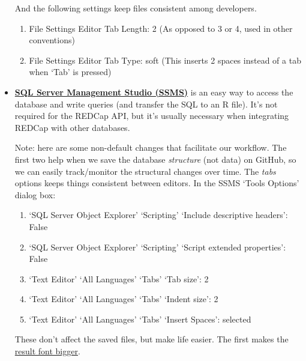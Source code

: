 \documentclass[]{book}
\providecommand{\tightlist}{%
  \setlength{\itemsep}{0pt}\setlength{\parskip}{0pt}}
\begin{document}
\begin{itemize}
  And the following settings keep files consistent among developers.

  \begin{enumerate}
  \def\labelenumi{\arabic{enumi}.}
  \tightlist
  \item
    File \textbar{} Settings \textbar{} Editor \textbar{} Tab Length: 2 (As opposed to 3 or 4, used in other conventions)
  \item
    File \textbar{} Settings \textbar{} Editor \textbar{} Tab Type: soft (This inserts 2 spaces instead of a tab when `Tab' is pressed)
  \end{enumerate}
\item
  \textbf{\href{https://docs.microsoft.com/en-us/sql/ssms/download-sql-server-management-studio-ssms}{SQL Server Management Studio (SSMS)}} is an easy way to access the database and write queries (and transfer the SQL to an R file). It's not required for the REDCap API, but it's usually necessary when integrating REDCap with other databases.

  Note: here are some non-default changes that facilitate our workflow. The first two help when we save the database \emph{structure} (not data) on GitHub, so we can easily track/monitor the structural changes over time. The \emph{tabs} options keeps things consistent between editors. In the SSMS `Tools \textbar{} Options' dialog box:

  \begin{enumerate}
  \def\labelenumi{\arabic{enumi}.}
  \tightlist
  \item
    `SQL Server Object Explorer' \textbar{} `Scripting' \textbar{} `Include descriptive headers': False
  \item
    `SQL Server Object Explorer' \textbar{} `Scripting' \textbar{} `Script extended properties': False
  \item
    `Text Editor' \textbar{} `All Languages' \textbar{} `Tabs' \textbar{} `Tab size': 2
  \item
    `Text Editor' \textbar{} `All Languages' \textbar{} `Tabs' \textbar{} `Indent size': 2
  \item
    `Text Editor' \textbar{} `All Languages' \textbar{} `Tabs' \textbar{} `Insert Spaces': selected
  \end{enumerate}

  These don't affect the saved files, but make life easier. The first makes the \href{https://blog.sqlauthority.com/2016/05/31/sql-server-ssms-tip-get-larger-fonts-results-grid-output/}{result font bigger}.


\end{itemize}
\end{document}
